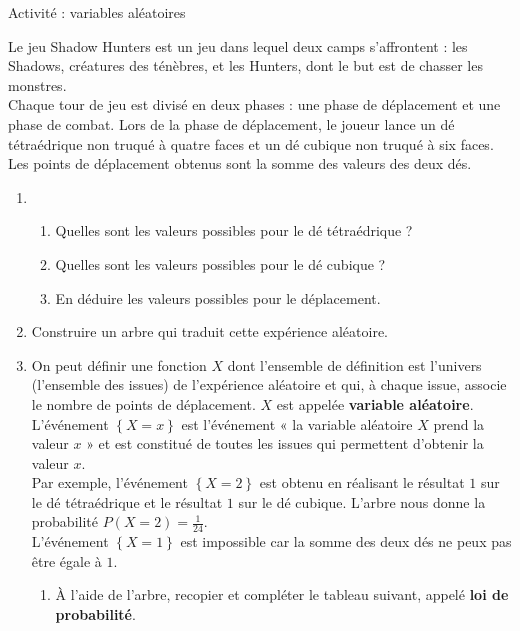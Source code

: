 \documentclass[11pt]{article}
\begin{document}
\begin{center}
  \Large Activité : variables aléatoires
\end{center}

Le jeu Shadow Hunters est un jeu dans lequel deux camps s'affrontent : les
Shadows, créatures des ténèbres, et les Hunters, dont le but est de chasser les
monstres.\\
Chaque tour de jeu est divisé en deux phases : une phase de déplacement et une
phase de combat. Lors de la phase de déplacement, le joueur lance un dé
tétraédrique non truqué à quatre faces et un dé cubique non truqué à six faces.
Les points de déplacement obtenus sont la somme des valeurs des deux dés.
\begin{enumerate}
  \item \begin{enumerate}
      \item Quelles sont les valeurs possibles pour le dé tétraédrique ?
      \item Quelles sont les valeurs possibles pour le dé cubique ?
      \item En déduire les valeurs possibles pour le déplacement.
    \end{enumerate}
  \item Construire un arbre qui traduit cette expérience aléatoire.
  \item On peut définir une fonction $X$ dont l'ensemble de définition est
    l'univers (l'ensemble des issues) de l'expérience aléatoire et qui, à chaque
    issue, associe le nombre de points de déplacement. $X$ est appelée
    \textbf{variable aléatoire}.\\
    L'événement $\left\{ X=x \right\}$ est l'événement « la variable aléatoire
    $X$ prend la valeur $x$ » et est constitué de toutes les issues qui
    permettent d'obtenir la valeur $x$.\\
    Par exemple, l'événement $\left\{ X=2 \right\}$ est obtenu en réalisant le
    résultat $1$ sur le dé tétraédrique et le résultat $1$ sur le dé cubique.
    L'arbre nous donne la probabilité $P\left( X=2 \right)=\frac{1}{24}$.\\
    L'événement $\left\{ X=1 \right\}$ est impossible car la somme des deux dés
    ne peux pas être égale à $1$.
    \begin{enumerate}
      \item À l'aide de l'arbre, recopier et compléter le tableau suivant,
        appelé \textbf{loi de probabilité}.
        \begin{center}

\end{center}
\end{enumerate}
\end{enumerate}
\end{document}
